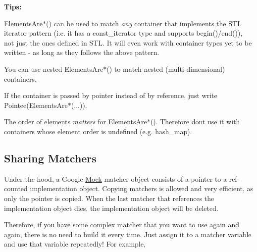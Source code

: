 \begin{DoxyCode}{0}
\end{DoxyCode}


{\bfseries{Tips\+:}}


\begin{DoxyItemize}
\item {\ttfamily Elements\+Are$\ast$()} can be used to match {\itshape any} container that implements the S\+TL iterator pattern (i.\+e. it has a {\ttfamily const\+\_\+iterator} type and supports {\ttfamily begin()/end()}), not just the ones defined in S\+TL. It will even work with container types yet to be written -\/ as long as they follows the above pattern.
\item You can use nested {\ttfamily Elements\+Are$\ast$()} to match nested (multi-\/dimensional) containers.
\item If the container is passed by pointer instead of by reference, just write {\ttfamily Pointee(\+Elements\+Are$\ast$(...))}.
\item The order of elements {\itshape matters} for {\ttfamily Elements\+Are$\ast$()}. Therefore don\textquotesingle{}t use it with containers whose element order is undefined (e.\+g. {\ttfamily hash\+\_\+map}).
\end{DoxyItemize}

\subsection*{Sharing Matchers}

Under the hood, a Google \mbox{\hyperlink{classMock}{Mock}} matcher object consists of a pointer to a ref-\/counted implementation object. Copying matchers is allowed and very efficient, as only the pointer is copied. When the last matcher that references the implementation object dies, the implementation object will be deleted.

Therefore, if you have some complex matcher that you want to use again and again, there is no need to build it every time. Just assign it to a matcher variable and use that variable repeatedly! For example,


\begin{DoxyCode}{0}
\end{DoxyCode}


